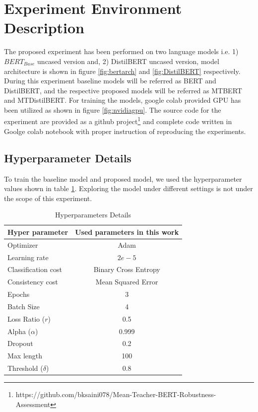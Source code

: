 \documentclass[%
	BCOR=8mm, %
	DIV=12,
	toc=bibliography, %
	toc=listof, %
	oneside, %
	egregdoesnotlikesansseriftitles, %
	]{scrbook}
\begin{document}
\section{Experiment Environment Description}
\label{section: experimentenv}
The proposed experiment has been performed on two language models i.e. 1) $BERT_{Base}$ uncased version  and, 2) DistilBERT uncased version, model architecture is shown in figure \ref{fig:bertarch} and \ref{fig:DistilBERT} respectively. During this experiment baseline models will be referred as BERT and DistilBERT, and the respective proposed models will be referred as MTBERT and MTDistilBERT. For training the models, google colab provided GPU has been utilized as shown in figure \ref{fig:nvidiagpu}. The source code for the experiment are provided as a github project\footnote{https://github.com/bksaini078/Mean-Teacher-BERT-Robustness-Assessment} and complete code written in Goolge colab notebook with proper instruction of reproducing the experiments.
\subsection{Hyperparameter Details}
\label{subsection:hyperparameter}
To train the baseline model and proposed model, we used the hyperparameter values shown in table \ref{table:HyperparameterTable}. Exploring the model under different settings is not under the scope of this experiment. 
\begin{table}[H]
\centering
\begin{tabular}{ l c | c | }
\hline
Hyper parameter 		& \multicolumn{2}{c}{Used parameters in this work}\\
\hline
Optimizer 				& \multicolumn{2}{c}{Adam} \\
Learning rate 			& \multicolumn{2}{c}{ $2e - 5$ } \\
Classification cost 			& \multicolumn{2}{c}{Binary Cross Entropy}  \\
Consistency cost 			& \multicolumn{2}{c}{Mean Squared Error}  \\
Epochs 				& \multicolumn{2}{c}{$3$} \\
Batch Size 			& \multicolumn{2}{c}{4 } \\
Loss Ratio ($r$)			&\multicolumn{2}{c}{0.5}\\
Alpha ($\alpha$)			&\multicolumn{2}{c}{0.999}\\
Dropout  			& \multicolumn{2}{c}{0.2}  \\
Max length 			 & \multicolumn{2}{c}{100}  \\
Threshold ($\delta$) & \multicolumn{2}{c}{ $0.8$ }\\
\hline
\end{tabular}
\caption[Details of hyperparameters details]{Hyperparameters Details}
\label{table:HyperparameterTable}
\end{table}
\end{document}
